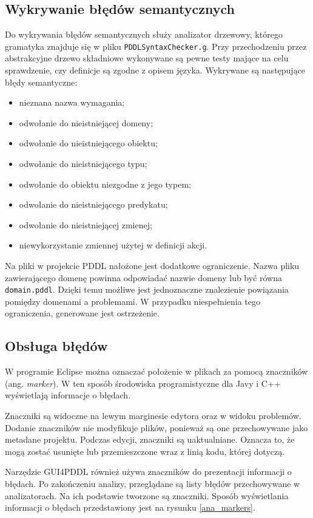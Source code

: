 \subsection{Wykrywanie błędów semantycznych}
Do wykrywania błędów semantycznych służy analizator drzewowy, którego gramatyka znajduje się
w pliku \texttt{PDDLSyntaxChecker.g}. Przy przechodzeniu przez abstrakcyjne drzewo składniowe
wykonywane są pewne testy mające na celu sprawdzenie, czy definicje są zgodne z opisem języka.
Wykrywane są następujące błędy semantyczne:
\begin{itemize}
\item nieznana nazwa wymagania;
\item odwołanie do nieistniejącej domeny;
\item odwołanie do nieistniejącego obiektu;
\item odwołanie do nieistniejącego typu;
\item odwołanie do obiektu niezgodne z jego typem;
\item odwołanie do nieistniejącego predykatu;
\item odwołanie do nieistniejącej zmienej;
\item niewykorzystanie zmiennej użytej w definicji akcji.
\end{itemize}

Na pliki w projekcie PDDL nałożone jest dodatkowe ograniczenie. Nazwa pliku zawierającego 
domenę powinna odpowiadać nazwie domeny lub być równa \texttt{domain.pddl}. Dzięki temu 
możliwe jest jednoznaczne znalezienie powiązania pomiędzy domenami a problemami. W przypadku
niespełnienia tego ograniczenia, generowane jest ostrzeżenie.

\subsection{Obsługa błędów}
W programie Eclipse można oznaczać położenie w plikach za pomocą znaczników (ang. \emph{marker}). W ten sposób
środowiska programistyczne dla Javy i C++ wyświetlają informacje o błędach.

Znaczniki są widoczne na lewym marginesie edytora oraz w widoku problemów. Dodanie znaczników
nie modyfikuje plików, ponieważ są one przechowywane jako metadane projektu. Podczas edycji,
znaczniki są uaktualniane. Oznacza to, że mogą zostać usunięte lub przemieszczone wraz z linią
kodu, której dotyczą.

Narzędzie GUI4PDDL również używa znaczników do prezentacji informacji o błędach. Po zakończeniu 
analizy, przeglądane są listy błędów przechowywane w analizatorach. Na ich podstawie tworzone
są znaczniki. Sposób wyświetlania informacji o błędach przedstawiony jest na rysunku \ref{ana_markers}.

